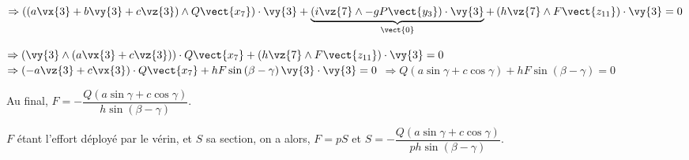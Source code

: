 \begin{corrige}
$
\Rightarrow
\left(\left(a\vx{3}+b\vy{3}+c\vz{3}\right)\wedge Q\vect{x_7} \right) \cdot \vy{3} 
+ \underbrace{\left( i\vz{7}\wedge -gP\vect{y_3} \right) \cdot \vy{3}}_{\vect{0}}
+ \left(h\vz{7}\wedge F\vect{z_{11}} \right)  \cdot \vy{3}=0
$

$
\Rightarrow
\left(\vy{3} \wedge \left(a\vx{3}+c\vz{3}\right)  \right) \cdot   Q\vect{x_7}
+ \left(h\vz{7}\wedge F\vect{z_{11}} \right)  \cdot \vy{3}=0
$
$
\Rightarrow
\left( -a\vz{3}+c\vx{3}\right)   \cdot   Q\vect{x_7}
+ hF \sin\left(\beta - \gamma\right)\vy{3}  \cdot \vy{3}=0
$
$
\Rightarrow
Q\left( a\sin \gamma+c\cos\gamma \right)  
+ hF \sin\left(\beta - \gamma\right)=0
$

Au final, $F= - \dfrac{Q\left( a\sin \gamma+c\cos\gamma \right)  }{ h \sin\left(\beta - \gamma\right)}$.

$F$ étant l'effort déployé par le vérin, et $S$ sa section, on a alors, $F=pS$ et 
$S= - \dfrac{Q\left( a\sin \gamma+c\cos\gamma \right)  }{p h \sin\left(\beta - \gamma\right)}$.

\end{corrige}
\else
\fi

\ifprof
\else
{}
\fi

